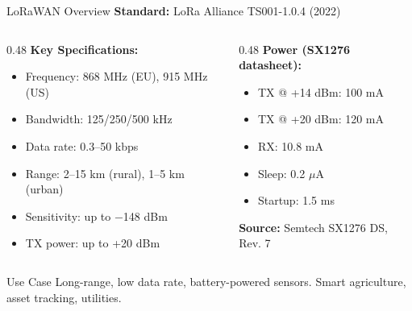 \documentclass[aspectratio=169,11pt]{beamer}
\begin{document}
\begin{frame}{LoRaWAN Overview}
    \textbf{Standard:} LoRa Alliance TS001-1.0.4 (2022)
    
    \vspace{0.3cm}
    \begin{columns}[T]
        \begin{column}{0.48\textwidth}
            \textbf{Key Specifications:}
            \begin{itemize}
                \item Frequency: 868 MHz (EU), 915 MHz (US)
                \item Bandwidth: 125/250/500 kHz
                \item Data rate: 0.3--50 kbps
                \item Range: 2--15 km (rural), 1--5 km (urban)
                \item Sensitivity: up to $-$148 dBm
                \item TX power: up to +20 dBm
            \end{itemize}
        \end{column}
        \begin{column}{0.48\textwidth}
            \textbf{Power (SX1276 datasheet):}
            \begin{itemize}
                \item TX @ +14 dBm: 100 mA
                \item TX @ +20 dBm: 120 mA
                \item RX: 10.8 mA
                \item Sleep: 0.2 $\mu$A
                \item Startup: 1.5 ms
            \end{itemize}
            
            \vspace{0.2cm}
            \textbf{Source:} Semtech SX1276 DS, Rev. 7
        \end{column}
    \end{columns}
    
    \vspace{0.3cm}
    \begin{block}{Use Case}
        Long-range, low data rate, battery-powered sensors. Smart agriculture, asset tracking, utilities.
    \end{block}
\end{frame}
\end{document}
